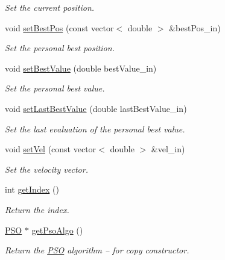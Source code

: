 \begin{CompactItemize}
\begin{CompactList}\small\item\em Set the current position. \item\end{CompactList}\item 
void \hyperlink{classBird_1899bc1ad99de27864b35d509f87ef96}{setBestPos} (const vector$<$ double $>$ \&bestPos\_\-in)
\begin{CompactList}\small\item\em Set the personal best position. \item\end{CompactList}\item 
void \hyperlink{classBird_b0eeeade7db24cf936f9815f2082e7a9}{setBestValue} (double bestValue\_\-in)
\begin{CompactList}\small\item\em Set the personal best value. \item\end{CompactList}\item 
void \hyperlink{classBird_e3f3b24b964132d871dc68c6c6e81a07}{setLastBestValue} (double lastBestValue\_\-in)
\begin{CompactList}\small\item\em Set the last evaluation of the personal best value. \item\end{CompactList}\item 
void \hyperlink{classBird_164ec9a9b0fde87bf54ed9390a9729c9}{setVel} (const vector$<$ double $>$ \&vel\_\-in)
\begin{CompactList}\small\item\em Set the velocity vector. \item\end{CompactList}\item 
int \hyperlink{classBird_4da69cbb9543c97cde515d3ec54a1c4d}{getIndex} ()
\begin{CompactList}\small\item\em Return the index. \item\end{CompactList}\item 
\hyperlink{classPSO}{PSO} $\ast$ \hyperlink{classBird_858ff60114b075e1d82448826ff3e3ff}{getPsoAlgo} ()
\begin{CompactList}\small\item\em Return the \hyperlink{classPSO}{PSO} algorithm -- for copy constructor. \item\end{CompactList}\item 

\end{CompactItemize}
